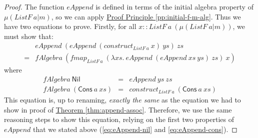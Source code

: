 \documentclass{jfp1}
\newcommand{\proofprinref}[1]{\hyperref[#1]{Proof Principle \ref*{#1}}}
\newcommand{\thmref}[1]{\hyperref[#1]{Theorem \ref*{#1}}}
\begin{document}
\begin{proof}
  The function $\mathit{eAppend}$ is defined in terms of the initial
  algebra property of $\mu(\mathit{ListF}~a|m)$, so we can apply
  \proofprinref{pp:initial-f-m-alg}. Thus we have two equations to
  prove. Firstly, for all $x ::
  \mathit{ListF}~a~(\mu(\mathit{ListF}~a|m))$, we must show that:
  \begin{displaymath}
    \begin{array}{cl}
      &\mathit{eAppend}~(\mathit{eAppend}~(\mathit{construct}_{\mathit{ListF}~a}~x)~\mathit{ys})~\mathit{zs}\\
      =&\mathit{fAlgebra}~(\mathit{fmap}_{\mathit{ListF}~a}~(\lambda \mathit{xs}.~\mathit{eAppend}~(\mathit{eAppend}~\mathit{xs}~\mathit{ys})~\mathit{zs})~x)
    \end{array}
  \end{displaymath}
  where
  \begin{displaymath}
    \begin{array}{rcl}
      \mathit{fAlgebra}~\mathsf{Nil} &=& \mathit{eAppend}~\mathit{ys}~\mathit{zs} \\
      \mathit{fAlgebra}~(\mathsf{Cons}~a~\mathit{xs}) &=& \mathit{construct}_{\mathit{ListF}~a}~(\mathsf{Cons}~a~\mathit{xs})
    \end{array}
  \end{displaymath}
  This equation is, up to renaming, \emph{exactly the same} as the
  equation we had to show in proof of
  \thmref{thm:append-assoc}. Therefore, we use the same reasoning
  steps to show this equation, relying on the first two properties of
  $\mathit{eAppend}$ that we stated above (\autoref{eq:eAppend-nil}
  and \autoref{eq:eAppend-cons}).


\end{proof}
\end{document}

